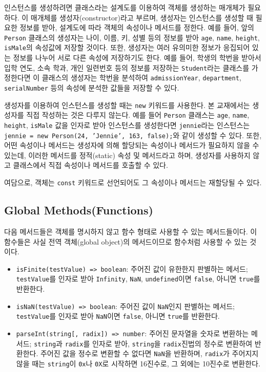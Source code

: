 인스턴스를 생성하려면 클래스라는 설계도를 이용하여 객체를 생성하는 매개체가 필요하다. 이 매개체를 생성자(constructor)라고 부르며, 생성자는 인스턴스를 생성할 때 필요한 정보를 받아, 설계도에 따라 객체의 속성이나 메서드를 정한다. 예를 들어, 앞의 \texttt{Person} 클래스의 생성자는 나이, 이름, 키, 성별 등의 정보를 받아 \texttt{age}, \texttt{name}, \texttt{height}, \texttt{isMale}의 속성값에 저장할 것이다. 또한, 생성자는 여러 유의미한 정보가 응집되어 있는 정보를 나누어 서로 다른 속성에 저장하기도 한다. 예를 들어, 학생의 학번을 받아서 입학 연도, 소속 학과, 개인 일련번호 등의 정보를 저장하는 \texttt{Student}라는 클래스를 가정한다면 이 클래스의 생성자는 학번을 분석하여 \texttt{admissionYear}, \texttt{department}, \texttt{serialNumber} 등의 속성에 분석한 값들을 저장할 수 있다.

생성자를 이용하여 인스턴스를 생성할 때는 \texttt{new} 키워드를 사용한다. 본 교재에서는 생성자를 직접 작성하는 것은 다루지 않는다. 예를 들어 \texttt{Person} 클래스는 \texttt{age}, \texttt{name}, \texttt{height}, \texttt{isMale} 값을 인자로 받아 인스턴스를 생성한다면 \texttt{jennie}라는 인스턴스는 \texttt{jennie = new Person(24, 'Jennie', 163, false);}와 같이 생성할 수 있다. 또한, 어떤 속성이나 메서드는 생성자에 의해 할당되는 속성이나 메서드가 필요하지 않을 수 있는데, 이러한 메서드를 정적(static) 속성 및 메서드라고 하며, 생성자를 사용하지 않고 클래스에서 직접 속성이나 메서드를 호출할 수 있다.

여담으로, 객체는 \texttt{const} 키워드로 선언되어도 그 속성이나 메서드는 재할당될 수 있다.

\subsection*{Global Methods(Functions)}

다음 메서드들은 객체를 명시하지 않고 함수 형태로 사용할 수 있는 메서드들이다. 이 함수들은 사실 전역 객체(global object)의 메서드이므로 함수처럼 사용할 수 있는 것이다.

\begin{itemize}
    \item \texttt{isFinite(testValue) => boolean}: 주어진 값이 유한한지 판별하는 메서드; \texttt{testValue}를 인자로 받아 \texttt{Infinity}, \texttt{NaN}, \texttt{undefined}이면 \texttt{false}, 아니면 \texttt{true}를 반환한다.
    \item \texttt{isNaN(testValue) => boolean}: 주어진 값이 \texttt{NaN}인지 판별하는 메서드; \texttt{testValue}를 인자로 받아 \texttt{NaN}이면 \texttt{false}, 아니면 \texttt{true}를 반환한다.
    \item \texttt{parseInt(string[, radix]) => number}: 주어진 문자열을 숫자로 변환하는 메서드; \texttt{string}과 \texttt{radix}를 인자로 받아, \texttt{string}을 \texttt{radix}진법의 정수로 변환하여 반환한다. 주어진 값을 정수로 변환할 수 없다면 \texttt{NaN}을 반환하며, \texttt{radix}가 주어지지 않을 때는 \texttt{string}이 \texttt{0x}나 \texttt{0X}로 시작하면 16진수로, 그 외에는 10진수로 변환한다.
\end{itemize}

